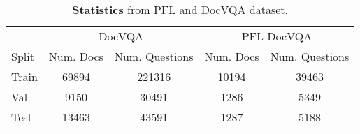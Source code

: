\begin{table}[H]
\begin{center}
\begin{small}
\small
\begin{tabular}{lcccc}
\toprule
 & \multicolumn{2}{c}{DocVQA} & \multicolumn{2}{c}{PFL-DocVQA} \\
\cmidrule(l){2-3}
\cmidrule(l){4-5}
Split & Num. Docs & Num. Questions & Num. Docs & Num. Questions \\
\midrule 
Train & 69894 & 221316 & 10194 & 39463\\
Val & 9150 & 30491 & 1286 & 5349\\
Test & 13463 & 43591 & 1287 & 5188\\
\bottomrule
\end{tabular}
\end{small}
\end{center}
\vspace{-0.1in}
\caption{\textbf{Statistics} from PFL and DocVQA dataset.}
\label{tab:dataset_stats}
\vspace{-0.1in}
\end{table}